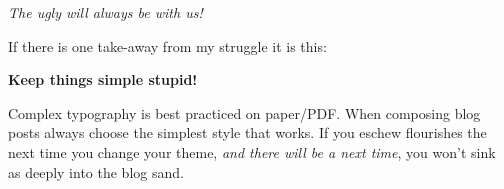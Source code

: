 \emph{The ugly will always be with us!}

If there is one take-away from my struggle it is this:

\Large
\begin{center}\textbf{Keep things simple stupid!}\end{center}
\normalsize

Complex typography is best practiced on paper/PDF. When composing blog
posts always choose the simplest style that works. If you eschew
flourishes the next time you change your theme, \emph{and there will be
a next time}, you won't sink as deeply into the blog sand.

%
%



%
